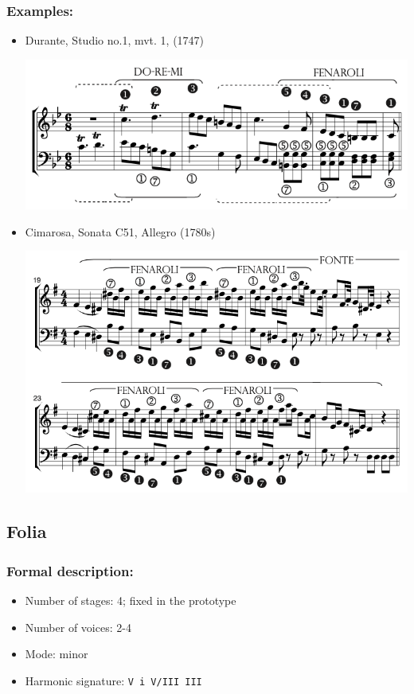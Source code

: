 ﻿\documentclass[11pt, openany]{article}
\begin{document}
\subsubsection{Examples:}
\begin{itemize}
\item Durante, Studio no.1, mvt. 1, (1747)
\begin{center}
\includegraphics[scale=0.5]{durante1.png}
\end{center}
\item Cimarosa, Sonata C51, Allegro (1780s)
\begin{center}
\includegraphics[scale=0.5]{cimarosa51.png}
\end{center}
\end{itemize}


	\subsection{Folia}
	
\subsubsection{Formal description:}
\begin{itemize}
\item Number of stages: 4; fixed in the prototype
\item Number of voices: 2-4
\item Mode: minor
\item Harmonic signature: \texttt{V i V/III III}
\end{itemize}
\end{document}
